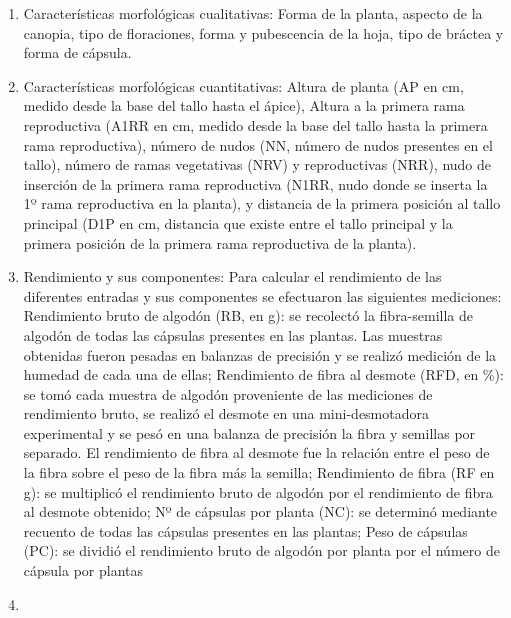 \documentclass[12pt,oneside]{reedthesis}
\begin{document}
\begin{enumerate}
\def\labelenumi{\roman{enumi})}
\item
  Características morfológicas cualitativas: Forma de la planta, aspecto de la canopia, tipo de floraciones, forma y pubescencia de la hoja, tipo de bráctea y forma de cápsula.
\item
  Características morfológicas cuantitativas: Altura de planta (AP en cm, medido desde la base del tallo hasta el ápice), Altura a la primera rama reproductiva (A1RR en cm, medido desde la base del tallo hasta la primera rama reproductiva), número de nudos (NN, número de nudos presentes en el tallo), número de ramas vegetativas (NRV) y reproductivas (NRR), nudo de inserción de la primera rama reproductiva (N1RR, nudo donde se inserta la 1º rama reproductiva en la planta), y distancia de la primera posición al tallo principal (D1P en cm, distancia que existe entre el tallo principal y la primera posición de la primera rama reproductiva de la planta).
\item
  Rendimiento y sus componentes: Para calcular el rendimiento de las diferentes entradas y sus componentes se efectuaron las siguientes mediciones: Rendimiento bruto de algodón (RB, en g): se recolectó la fibra-semilla de algodón de todas las cápsulas presentes en las plantas. Las muestras obtenidas fueron pesadas en balanzas de precisión y se realizó medición de la humedad de cada una de ellas; Rendimiento de fibra al desmote (RFD, en \%): se tomó cada muestra de algodón proveniente de las mediciones de rendimiento bruto, se realizó el desmote en una mini-desmotadora experimental y se pesó en una balanza de precisión la fibra y semillas por separado. El rendimiento de fibra al desmote fue la relación entre el peso de la fibra sobre el peso de la fibra más la semilla; Rendimiento de fibra (RF en g): se multiplicó el rendimiento bruto de algodón por el rendimiento de fibra al desmote obtenido; Nº de cápsulas por planta (NC): se determinó mediante recuento de todas las cápsulas presentes en las plantas; Peso de cápsulas (PC): se dividió el rendimiento bruto de algodón por planta por el número de cápsula por plantas
\item

\end{enumerate}
\end{document}
